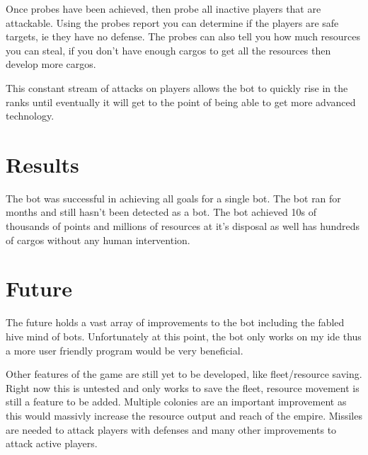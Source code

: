 \documentclass[twoside,twocolumn]{article}
\begin{document}
Once probes have been achieved, then probe all inactive players that are attackable.
Using the probes report you can determine if the players are safe targets, ie they have no
defense.  The probes can also tell you how much resources you can steal, if you don't
have enough cargos to get all the resources then develop more cargos.

This constant stream of attacks on players allows the bot to quickly rise in the ranks
until eventually it will get to the point of being able to get more advanced technology.


\section{Results}

The bot was successful in achieving all goals for a single bot.  The bot ran for months
and still hasn't been detected as a bot.  The bot achieved 10s of thousands of points
and millions of resources at it's disposal as well has hundreds of cargos without any
human intervention.



\section{Future}

The future holds a vast array of improvements to the bot including the fabled hive mind
of bots.  Unfortunately at this point, the bot only works on my ide thus a more user
friendly program would be very beneficial.

Other features of the game are still yet to be developed, like fleet/resource saving.
Right now this is untested and only works to save the fleet, resource movement is still
a feature to be added.  Multiple colonies are an important improvement as this would
massivly increase the resource output and reach of the empire.  Missiles are needed
to attack players with defenses and many other improvements to attack active players.
\end{document}
